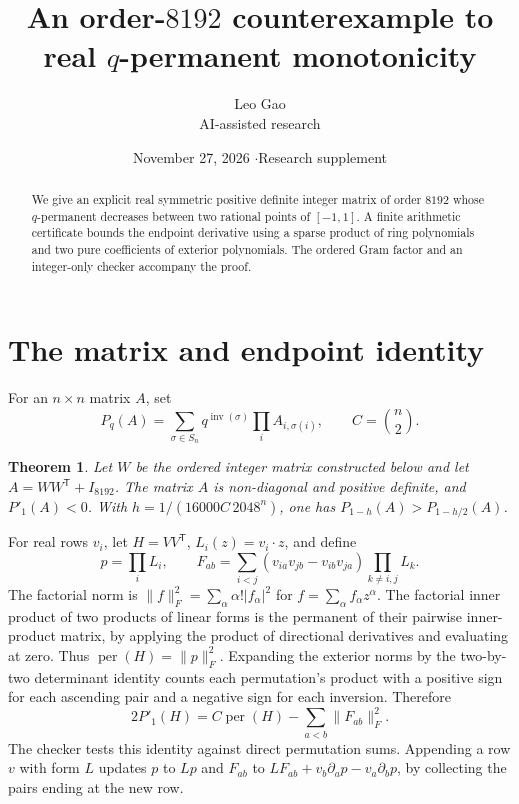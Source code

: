 \documentclass[10pt]{article}
\title{An order-$8192$ counterexample to real $q$-permanent monotonicity}
\author{Leo Gao\\[-1pt]{\small AI-assisted research}}
\date{November 27, 2026 \quad$\cdot$\quad Research supplement}
\DeclareMathOperator{\perma}{per}
\DeclareMathOperator{\inv}{inv}
\newtheorem{theorem}{Theorem}
\begin{document}
\maketitle
\begin{abstract}
We give an explicit real symmetric positive definite integer matrix of order
$8192$ whose $q$-permanent decreases between two rational points of $[-1,1]$.
A finite arithmetic certificate bounds the endpoint derivative using a
sparse product of ring polynomials and two pure coefficients of exterior
polynomials. The ordered Gram factor and an integer-only checker accompany
the proof.
\end{abstract}

\section{The matrix and endpoint identity}

For an $n\times n$ matrix $A$, set
\[
 P_q(A)=\sum_{\sigma\in S_n}q^{\inv(\sigma)}\prod_i A_{i,\sigma(i)},
 \qquad C=\binom n2 .
\]
\begin{theorem}
Let $W$ be the ordered integer matrix constructed below and let
$A=WW^{\mathsf T}+I_{8192}$. The matrix $A$ is non-diagonal and positive
definite, and $P'_1(A)<0$. With $h=1/(16000C\,2048^n)$, one has
$P_{1-h}(A)>P_{1-h/2}(A)$.
\end{theorem}

For real rows $v_i$, let $H=VV^{\mathsf T}$, $L_i(z)=v_i\cdot z$, and define
\[
 p=\prod_iL_i,\qquad
 F_{ab}=\sum_{i<j}(v_{ia}v_{jb}-v_{ib}v_{ja})
                  \prod_{k\ne i,j}L_k .
\]
The factorial norm is $\|f\|_F^2=\sum_\alpha \alpha!|f_\alpha|^2$ for
$f=\sum_\alpha f_\alpha z^\alpha$. The factorial inner product of two
products of linear forms is the permanent of their pairwise inner-product
matrix, by applying the product of directional derivatives and evaluating
at zero. Thus $\perma(H)=\|p\|_F^2$. Expanding the exterior norms by the
two-by-two determinant identity counts each permutation's product with
a positive sign for each ascending pair and a negative sign for each
inversion. Therefore
\begin{equation}\label{eq:endpoint}
 2P'_1(H)=C\perma(H)-\sum_{a<b}\|F_{ab}\|_F^2 .
\end{equation}
The checker tests this identity against direct permutation sums. Appending
a row $v$ with form $L$ updates $p$ to $Lp$ and $F_{ab}$ to
$LF_{ab}+v_b\partial_a p-v_a\partial_b p$, by collecting the pairs ending
at the new row.
\end{document}
